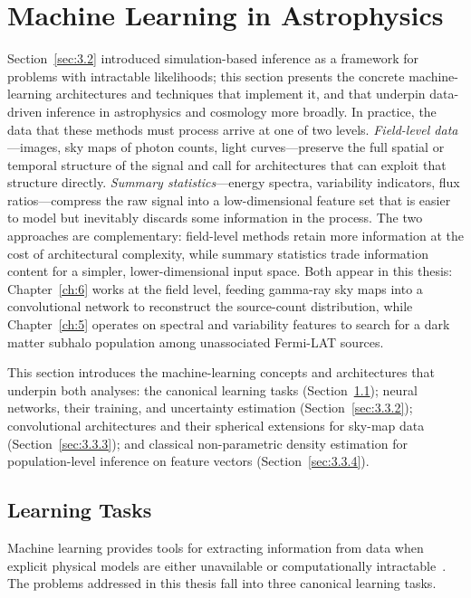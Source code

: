 \section{Machine Learning in Astrophysics}
\label{sec:3.3}
Section~\ref{sec:3.2} introduced simulation-based inference as a framework for problems with intractable likelihoods; this section presents the concrete machine-learning architectures and techniques that implement it, and that underpin data-driven inference in astrophysics and cosmology more broadly.
In practice, the data that these methods must process arrive at one of two levels.
\emph{Field-level data}---images, sky maps of photon counts, light curves---preserve the full spatial or temporal structure of the signal and call for architectures that can exploit that structure directly.
\emph{Summary statistics}---energy spectra, variability indicators, flux ratios---compress the raw signal into a low-dimensional feature set that is easier to model but inevitably discards some information in the process.
The two approaches are complementary: field-level methods retain more information at the cost of architectural complexity, while summary statistics trade information content for a simpler, lower-dimensional input space.
Both appear in this thesis: Chapter~\ref{ch:6} works at the field level, feeding gamma-ray sky maps into a convolutional network to reconstruct the source-count distribution, while Chapter~\ref{ch:5} operates on spectral and variability features to search for a dark matter subhalo population among unassociated Fermi-LAT sources.

This section introduces the machine-learning concepts and architectures that underpin both analyses: the canonical learning tasks (Section~\ref{sec:3.3.1}); neural networks, their training, and uncertainty estimation (Section~\ref{sec:3.3.2}); convolutional architectures and their spherical extensions for sky-map data (Section~\ref{sec:3.3.3}); and classical non-parametric density estimation for population-level inference on feature vectors (Section~\ref{sec:3.3.4}).

\subsection{Learning Tasks}
\label{sec:3.3.1}

Machine learning provides tools for extracting information from data when explicit physical models are either unavailable or computationally intractable~\cite{bishop,Hastie:2009}.
The problems addressed in this thesis fall into three canonical learning tasks.

